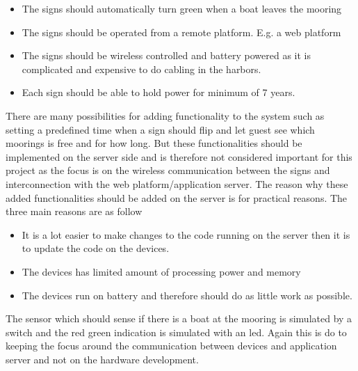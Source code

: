 \documentclass[a4paper,12pt,english]{article}
\begin{document}
\begin{itemize}
	\item The signs should automatically turn green when a boat leaves the mooring
	\item The signs should be operated from a remote platform. E.g. a web platform
	\item The signs should be wireless controlled and battery powered as it is
	      complicated and expensive to do cabling in the harbors.
	\item Each sign should be able to hold power for minimum of 7 years.
\end{itemize}

There are
many possibilities for adding functionality to the system such as setting a
predefined time when a sign should flip and let guest see which moorings is
free and for how long. But these functionalities should be implemented on the
server side and is therefore not considered important for this project as the
focus is on the wireless communication between the signs and interconnection
with the web platform/application server. The reason why these added
functionalities should be added on the server is for practical reasons. The
three main reasons are as follow

\begin{itemize}
  \item It is a lot easier to make changes to the code running on the server
  then it is to update the code on the devices.
  \item The devices has limited amount of processing power and memory
  \item The devices run on battery and therefore should do as little work as
  possible.
\end{itemize}  
  The sensor which should sense if there is a boat at the mooring is simulated
  by a switch and the red green indication is simulated with an led. Again this is do to
  keeping the focus around the communication between devices and application
  server and not on the hardware development.
\clearpage
\end{document}

